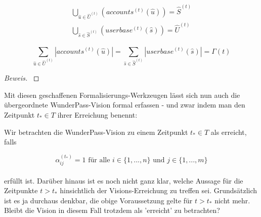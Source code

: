 \begin{Lemma}

\begin{align}
\bigcup_{\widehat{u} \in \widehat{U}^{(t)}} \left(accounts^{(t)} (\widehat{u})\right) = \widehat{S}^{(t)} \tag{i} \\
\bigcup_{\widehat{s} \in \widehat{S}^{(t)}} \left(userbase^{(t)} (\widehat{s})\right) = \widehat{U}^{(t)} \tag{ii}
\end{align}

\end{Lemma}

\vspace{0.6cm}

\begin{Theorem}

\begin{equation*}
\sum_{\widehat{u} \in \widehat{U}^{(t)}} |accounts^{(t)} (\widehat{u})| = \sum_{\widehat{s} \in \widehat{S}^{(t)}} |userbase^{(t)} (\widehat{s})| = \Gamma(t)
\end{equation*}

\end{Theorem}

\vspace{0.3cm}

\begin{proof}[Beweis] \textrm{ }


\end{proof}


\vspace{0.6cm}
\vspace{1cm}



\vspace{0.3cm}

Mit diesen geschaffenen Formalisierungs-Werkzeugen lässt sich nun auch die übergeordnete WunderPass-Vision formal erfassen - und zwar indem man den Zeitpunkt $t_{*} \in T$ ihrer Erreichung benennt:

\begin{Def}\label{defVision}

Wir betrachten die WunderPass-Vision zu einem Zeitpunkt $t_{*} \in T$ als erreicht, falls

\vspace{0.3cm}

\begin{equation}
\label{eq:1}
  \alpha^{(t_{*})}_{ij} = 1 \textrm{ für alle } i \in \{1,...,n\} \textrm{ und } j \in \{1,...,m\}
\end{equation}\\
erfüllt ist. Darüber hinaus ist es noch nicht ganz klar, welche Aussage für die Zeitpunkte $t > t_{*}$ hinsichtlich der Visions-Erreichung zu treffen sei. Grundsätzlich ist es ja durchaus denkbar, die obige Voraussetzung gelte für $t > t_{*}$ nicht mehr. Bleibt die Vision in diesem Fall trotzdem als 'erreicht' zu betrachten?

\end{Def}

